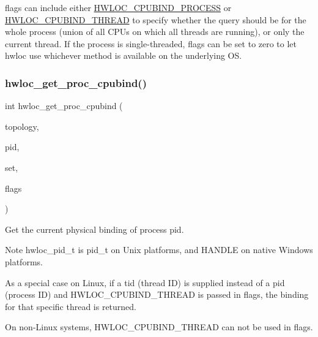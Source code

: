 {\ttfamily flags} can include either \hyperlink{a00190_gga217dc8d373f8958cc93c154ebce1c71ca2e0dd0128dac6b03408c7dd170477fdc}{H\+W\+L\+O\+C\+\_\+\+C\+P\+U\+B\+I\+N\+D\+\_\+\+P\+R\+O\+C\+E\+SS} or \hyperlink{a00190_gga217dc8d373f8958cc93c154ebce1c71caf1b6bbad00d7b1017b918e3719f4d421}{H\+W\+L\+O\+C\+\_\+\+C\+P\+U\+B\+I\+N\+D\+\_\+\+T\+H\+R\+E\+AD} to specify whether the query should be for the whole process (union of all C\+P\+Us on which all threads are running), or only the current thread. If the process is single-\/threaded, flags can be set to zero to let hwloc use whichever method is available on the underlying OS. \mbox{\label{a00190_gac82de91f788fa82dacf99c6e0d4b7158}} 
\subsubsection{\texorpdfstring{hwloc\+\_\+get\+\_\+proc\+\_\+cpubind()}{hwloc\_get\_proc\_cpubind()}}
{\footnotesize\ttfamily int hwloc\+\_\+get\+\_\+proc\+\_\+cpubind (\begin{DoxyParamCaption}\item[{\hyperlink{a00186_ga9d1e76ee15a7dee158b786c30b6a6e38}{hwloc\+\_\+topology\+\_\+t}}]{topology,  }\item[{hwloc\+\_\+pid\+\_\+t}]{pid,  }\item[{\hyperlink{a00183_ga4bbf39b68b6f568fb92739e7c0ea7801}{hwloc\+\_\+cpuset\+\_\+t}}]{set,  }\item[{int}]{flags }\end{DoxyParamCaption})}



Get the current physical binding of process {\ttfamily pid}. 

\begin{DoxyNote}{Note}
{\ttfamily hwloc\+\_\+pid\+\_\+t} is {\ttfamily pid\+\_\+t} on Unix platforms, and {\ttfamily H\+A\+N\+D\+LE} on native Windows platforms.

As a special case on Linux, if a tid (thread ID) is supplied instead of a pid (process ID) and H\+W\+L\+O\+C\+\_\+\+C\+P\+U\+B\+I\+N\+D\+\_\+\+T\+H\+R\+E\+AD is passed in flags, the binding for that specific thread is returned.

On non-\/\+Linux systems, H\+W\+L\+O\+C\+\_\+\+C\+P\+U\+B\+I\+N\+D\+\_\+\+T\+H\+R\+E\+AD can not be used in {\ttfamily flags}. 
\end{DoxyNote}
\mbox{\label{a00190_ga910a05c2d47f68a3155bf176b50fa555}} 
